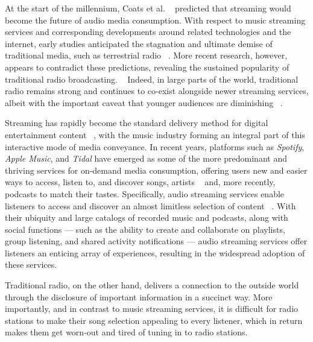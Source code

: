 \cleardoublepage
\label{chap:intro}
At the start of the millennium, Coats et al. ~\cite{Coats2000} predicted that streaming would become the future of audio media consumption. With respect to music streaming services and corresponding developments around related technologies and the internet, early studies anticipated the stagnation and ultimate demise of traditional media, such as terrestrial radio ~\cite{Ala-Fossi2008}. More recent research, however, appears to contradict these predictions, revealing the sustained popularity of traditional radio broadcasting. ~\cite{DangNguyen2012, Waits2007} Indeed, in large parts of the world, traditional radio remains strong and continues to co-exist alongside newer streaming services, albeit with the important caveat that younger audiences are diminishing ~\cite{Albarran2007}. 

Streaming has rapidly become the standard delivery method for digital entertainment content ~\cite{Swaminathan2013}, with the music industry forming an integral part of this interactive mode of media conveyance. In recent years, platforms such as \textit{Spotify}, \textit{Apple Music}, and \textit{Tidal} have emerged as some of the more predominant and thriving services for on-demand media consumption, offering users new and easier ways to access, listen to, and discover songs, artists ~\cite{Weijters2014} and, more recently, podcasts to match their tastes. Specifically, audio streaming services enable listeners to access and discover an almost limitless selection of content ~\cite{Morris2015}. With their ubiquity and large catalogs of recorded music and podcasts, along with social functions — such as the ability to create and collaborate on playlists, group listening, and shared activity notifications — audio streaming services offer listeners an enticing array of experiences, resulting in the widespread adoption of these services. ~\cite{Mantymaki2015}

Traditional radio, on the other hand, delivers a connection to the outside world through the disclosure of important information in a succinct way. More importantly, and in contrast to music streaming services, it is difficult for radio stations to make their song selection appealing to every listener, which in return makes them get worn-out and tired of tuning in to radio stations. 

